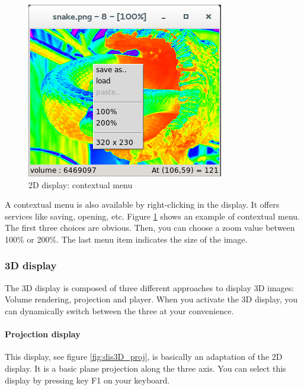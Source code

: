 \documentclass[a4paper,10pt,oneside]{article}
\begin{document}
\begin{figure}
\centering
\includegraphics[scale=0.5]{images/dis2D_menu.png}
\caption{2D display: contextual menu}
\label{fig:dis2D_menu}
\end{figure}

A contextual menu is also available by right-clicking in the display. It offers
services like saving, opening, etc. Figure \ref{fig:dis2D_menu} shows an example of 
contextual menu. The first three choices are obvious. Then, you can choose a zoom
value between 100\% or 200\%. The last menu item indicates the size of
the image.

\subsubsection{3D display}

The 3D display is composed of three different approaches to display 3D images:
Volume rendering, projection and player. When you activate the 3D display,
you can dynamically switch between the three at your convenience.


\paragraph{Projection display}

This display, see figure \ref{fig:dis3D_proj}, is basically an adaptation of
the 2D display. It is a basic plane projection along the three axis.
You can select this display by pressing key F1 on your keyboard.
\end{document}
